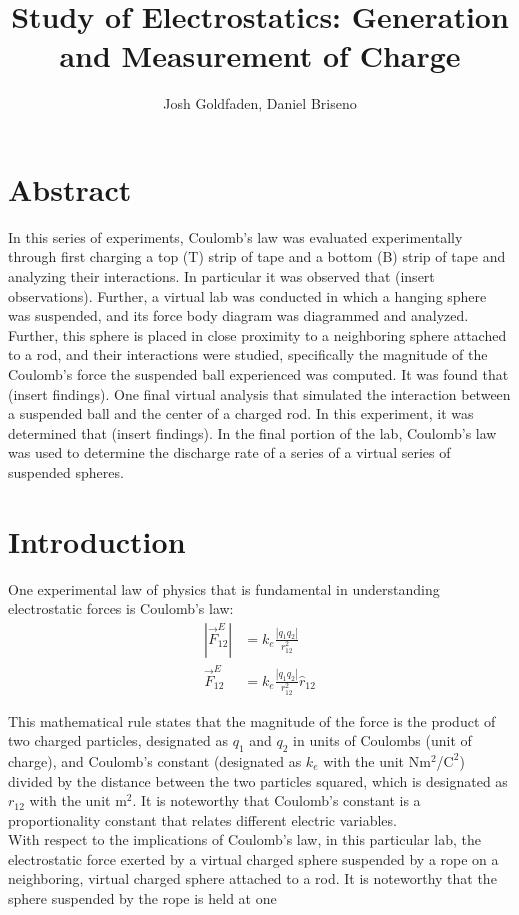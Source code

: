 \documentclass[oneside,12pt]{amsart}
\title{Study of Electrostatics: Generation and Measurement of Charge}
\author{Josh Goldfaden, Daniel Briseno}
\date{}
\begin{document}
	\section{Abstract}
	In this series of experiments, Coulomb’s law was evaluated experimentally through first charging a top (T) strip of tape and a bottom (B) strip of tape and analyzing their interactions. In particular it was observed that (insert observations). Further, a virtual lab was conducted in which a hanging sphere was suspended, and its force body diagram was diagrammed and analyzed. Further, this sphere is placed in close proximity to a neighboring sphere attached to a rod, and their interactions were studied, specifically the magnitude of the Coulomb's force the suspended ball experienced was computed. It was found that (insert findings). One final virtual analysis that simulated the interaction between a suspended ball and the center of a charged rod. In this experiment, it was determined that (insert findings). In the final portion of the lab, Coulomb’s law was used to determine the discharge rate of a series of a virtual series of suspended spheres. 
	\section{Introduction}
	One experimental law of physics that is fundamental in understanding electrostatic forces is Coulomb’s law: 
	\begin{align}
		|\vec{F}^E_{12}| &= k_e \frac{|q_1 q_2|}{r_{12}^2}\\
		\vec{F}^E_{12} &= k_e \frac{|q_1 q_2|}{r_{12}^2} \hat{r}_{12} 
	\end{align}
	
	\indent This mathematical rule states that the magnitude of the force is the product of two charged particles, designated as $q_1$ and $q_2$ in units of Coulombs (unit of charge), and Coulomb’s constant (designated as $k_e$ with the unit N$\text{m}^2$/$\text{C}^2$) divided by the distance between the two particles squared, which is designated as $r_{12}$ with the unit $\text{m}^2$. It is noteworthy that Coulomb’s constant is a proportionality constant that relates different electric variables.\\ 
	
	\indent With respect to the implications of Coulomb’s law, in this particular lab, the electrostatic force exerted by a virtual charged sphere suspended by a rope  on a neighboring, virtual charged sphere attached to a rod. It is noteworthy that the sphere suspended by the rope is held at one 
\end{document}

